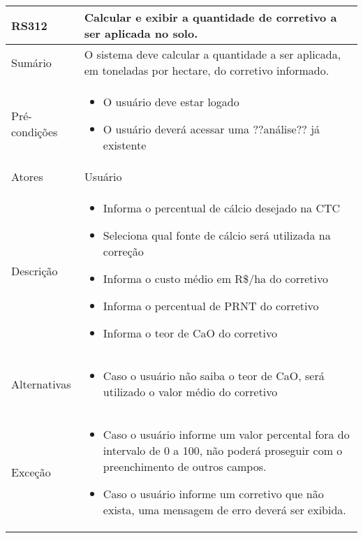 \begin{quadro}[H]
    \begin{tabular}{|p{3cm}|p{11cm}|}
        \hline
        \textbf{RS312} & \textbf{Calcular e exibir a quantidade de corretivo a ser aplicada no solo.}                           \\
        \hline
        Sumário        & O sistema deve calcular a quantidade a ser aplicada, em toneladas por hectare, do corretivo informado. \\
        \hline
        Pré-condições  & \begin{itemize}
            \item O usuário deve estar logado
            \item O usuário deverá acessar uma ??análise?? já existente
        \end{itemize}                                                                             \\
        \hline
        Atores         & Usuário                                                                                                \\
        \hline
        Descrição      &
        \begin{itemize}
            \item Informa o percentual de cálcio desejado na CTC
            \item Seleciona qual fonte de cálcio será utilizada na correção
            \item Informa o custo médio em R\$/ha do corretivo
            \item Informa o percentual de PRNT do corretivo
            \item Informa o teor de CaO do corretivo
        \end{itemize}                                                                                              \\
        \hline
        Alternativas   &
        \begin{itemize}
            \item Caso o usuário não saiba o teor de CaO, será utilizado o valor médio do corretivo
        \end{itemize}                                                                                              \\
        \hline
        Exceção        &
        \begin{itemize}
            \item Caso o usuário informe um valor percental fora do intervalo de 0 a 100, não poderá proseguir com o preenchimento de outros campos.
            \item Caso o usuário informe um corretivo que não exista, uma mensagem de erro deverá ser exibida.
        \end{itemize}                                                                                              \\
        \hline
    \end{tabular}
\end{quadro}

